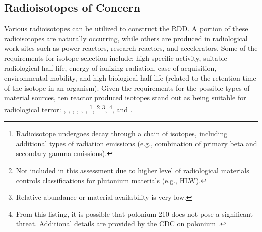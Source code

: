 \documentclass{report}
\begin{document}
\subsection{Radioisotopes of Concern}

Various radioisotopes can be utilized to construct the RDD.  A portion of these radioisotopes are naturally occurring, while others are produced in radiological work sites such as power reactors, research reactors, and accelerators.  Some of the requirements for isotope selection include: high specific activity, suitable radiological half life, energy of ionizing radiation, ease of acquisition, environmental mobility, and high biological half life (related to the retention time of the isotope in an organism).  Given the requirements for the possible types of material sources, ten reactor produced isotopes stand out as being suitable for radiological terror:  , , , , , ,  
\footnote{Radioisotope undergoes decay through a chain of isotopes, including additional types of radiation emissions (e.g., combination of primary beta and secondary gamma emissions).}, 
 \footnotemark[2] \footnote{Not included in this assessment due to higher level of radiological materials controls classifications for plutonium materials (e.g., HLW).} 
\footnote{Relative abundance or material availability is very low.}, 
 \footnotemark[2] \footnotemark[4] \footnote{From this listing, it is possible that polonium-210 does not pose a significant threat. Additional details are provided by the CDC on polonium \cite{CentersforDiseaseControlandPrevention2014}.}, 
and  \footnotemark[2] \footnotemark[4].



% 
\end{document}

